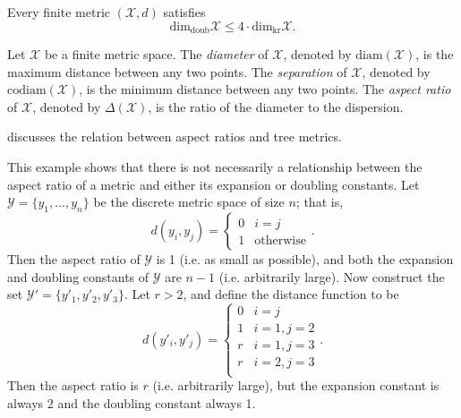 \documentclass[../main.tex]{subfiles}
\newcommand{\set}[1]{\mathcal {#1}}
\newcommand{\dist}[2]{\distf({#1},{#2})}
\newcommand{\distf}{d}
\newcommand{\diam}[1]{\text{diam}({#1})}
\newcommand{\codiam}[1]{\text{codiam}({#1})}
\newcommand{\aspect}[1]{\Delta({#1})}
\newcommand{\krdim}{\text{dim}_\text{kr}}
\newcommand{\doubdim}{\text{dim}_\text{doub}}
\begin{document}
\begin{lemma}
    Every finite metric $(\set X,d)$ satisfies
    \begin{equation}
        \doubdim\set X \le 4\cdot\krdim\set X
        .
    \end{equation}
\end{lemma}

\begin{definition}
    Let $\set X$ be a finite metric space.
    The \emph{diameter} of $\set X$, denoted by $\diam{\set X}$, is the maximum distance between any two points.
    The \emph{separation} of $\set X$, denoted by $\codiam{\set X}$, is the minimum distance between any two points.
    The \emph{aspect ratio} of $\set X$, denoted by $\aspect{\set X}$, is the ratio of the diameter to the dispersion.
\end{definition}

\cite{bartal2003metric} discusses the relation between aspect ratios and tree metrics.

\begin{example}
    This example shows that there is not necessarily a relationship between the aspect ratio of a metric and either its expansion or doubling constants.
    Let $\set Y=\{y_1,...,y_n\}$ be the discrete metric space of size $n$;
    that is,
    \begin{equation}
        \dist{y_i}{y_j}=
        \begin{cases}
            0 & i = j \\
            1 & \text{otherwise}
        \end{cases}
        .
    \end{equation}
    Then the aspect ratio of $\set Y$ is 1 (i.e. as small as possible),
    and both the expansion and doubling constants of $\set Y$ are $n-1$ (i.e. arbitrarily large).
    Now construct the set $\set Y'=\{y'_1, y'_2, y'_3\}$.
    Let $r>2$, and define the distance function to be
    \begin{equation}
        d(y'_i,y'_j) =
        \begin{cases}
            0 & i=j \\
            1 & i=1, j=2 \\
            r & i=1, j=3 \\
            r & i=2, j=3 \\
        \end{cases}
        .
    \end{equation}
    Then the aspect ratio is $r$ (i.e. arbitrarily large),
    but the expansion constant is always 2
    and the doubling constant always 1.
\end{example}
\end{document}
